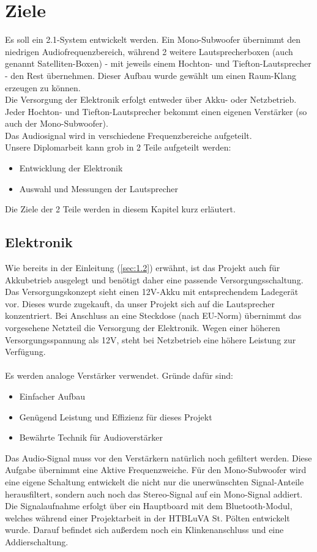 \section{Ziele}\label{sec:2.1}
Es soll ein 2.1-System entwickelt werden.
Ein Mono-Subwoofer übernimmt den niedrigen Audiofrequenzbereich, während 2 weitere Lautsprecherboxen (auch genannt Satelliten-Boxen) - mit jeweils einem Hochton- und Tiefton-Lautsprecher - den Rest übernehmen.
Dieser Aufbau wurde gewählt um einen Raum-Klang erzeugen zu können. \\
Die Versorgung der Elektronik erfolgt entweder über Akku- oder Netzbetrieb.
Jeder Hochton- und Tiefton-Lautsprecher bekommt einen eigenen Verstärker (so auch der Mono-Subwoofer). \\
Das Audiosignal wird in verschiedene Frequenzbereiche aufgeteilt.\\

Unsere Diplomarbeit kann grob in 2 Teile aufgeteilt werden:
\begin{itemize}
	\item Entwicklung der Elektronik
	\item Auswahl und Messungen der Lautsprecher
\end{itemize}
Die Ziele der 2 Teile werden in diesem Kapitel kurz erläutert.

\subsection{Elektronik}\label{subsec:2.1.1}
Wie bereits in der Einleitung (\ref{sec:1.2}) erwähnt, ist das Projekt auch für Akkubetrieb ausgelegt und benötigt daher eine passende Versorgungsschaltung.
Das Versorgungskonzept sieht einen 12V-Akku mit entsprechendem Ladegerät vor.
Dieses wurde zugekauft, da unser Projekt sich auf die Lautsprecher konzentriert.
Bei Anschluss an eine Steckdose (nach EU-Norm) übernimmt das vorgesehene Netzteil die Versorgung der Elektronik.
Wegen einer höheren Versorgungsspannung als 12V, steht bei Netzbetrieb eine höhere Leistung zur Verfügung. \\ \\
Es werden analoge Verstärker verwendet.
Gründe dafür sind:
\begin{itemize}
	\item Einfacher Aufbau
	\item Genügend Leistung und Effizienz für dieses Projekt
	\item Bewährte Technik für Audioverstärker
\end{itemize} 
Das Audio-Signal muss vor den Verstärkern natürlich noch gefiltert werden. Diese Aufgabe übernimmt eine Aktive Frequenzweiche. Für den Mono-Subwoofer wird eine eigene Schaltung entwickelt die nicht nur die unerwünschten Signal-Anteile herausfiltert, sondern auch noch das Stereo-Signal auf ein Mono-Signal addiert. \newpage
Die Signalaufnahme erfolgt über ein Hauptboard mit dem Bluetooth-Modul, welches während einer Projektarbeit in der HTBLuVA St. Pölten entwickelt wurde. Darauf befindet sich außerdem noch ein Klinkenanschluss und eine Addierschaltung.

